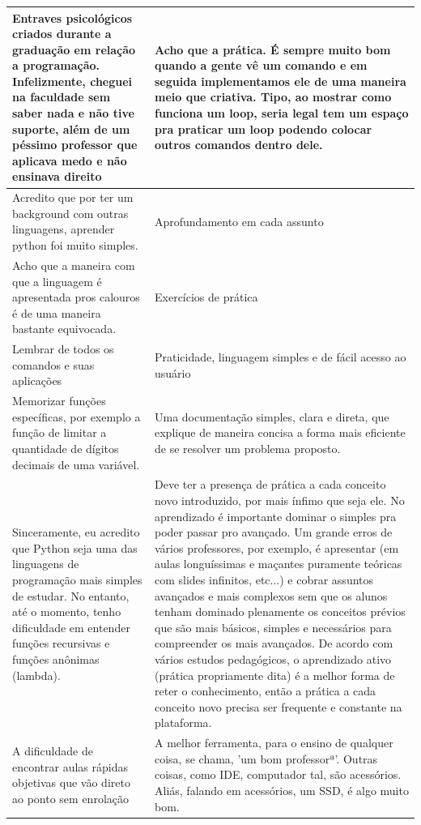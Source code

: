 \begin{longtable}{| p{} | p{} |}
    Entraves psicológicos criados durante a graduação em relação a programação. Infelizmente, cheguei na faculdade sem saber nada e não tive suporte, além de um péssimo professor que aplicava medo e não ensinava direito & Acho que a prática. É sempre muito bom quando a gente vê um comando e em seguida implementamos ele de uma maneira meio que criativa. Tipo, ao mostrar como funciona um loop, seria legal tem um espaço pra praticar um loop podendo colocar outros comandos dentro dele. \\ \hline
    Acredito que por ter um background com outras linguagens, aprender python foi muito simples. & Aprofundamento em cada assunto \\ \hline
    Acho que a maneira com que a linguagem é apresentada pros calouros é de uma maneira bastante equivocada. & Exercícios de prática \\ \hline
    Lembrar de todos os comandos e suas aplicações & Praticidade, linguagem simples e de fácil acesso ao usuário \\ \hline
    Memorizar funções específicas, por exemplo a função de limitar a quantidade de dígitos decimais de uma variável. & Uma documentação simples, clara e direta, que explique de maneira concisa a forma mais eficiente de se resolver um problema proposto. \\ \hline
    Sinceramente, eu acredito que Python seja uma das linguagens de programação mais simples de estudar. No entanto, até o momento, tenho dificuldade em entender funções recursivas e funções anônimas (lambda). & Deve ter a presença de prática a cada conceito novo introduzido, por mais ínfimo que seja ele. No aprendizado é importante dominar o simples pra poder passar pro avançado. Um grande erros de vários professores, por exemplo, é apresentar (em aulas longuíssimas e maçantes puramente teóricas com slides infinitos, etc...) e cobrar assuntos avançados e mais complexos sem que os alunos tenham dominado plenamente os conceitos prévios que são mais básicos, simples e necessários para compreender os mais avançados.  De acordo com vários estudos pedagógicos, o aprendizado ativo (prática propriamente dita) é a melhor forma de reter o conhecimento, então a prática a cada conceito novo precisa ser frequente e constante na plataforma. \\ \hline
    A dificuldade de encontrar aulas rápidas objetivas que vão direto ao ponto sem enrolação & A melhor ferramenta, para o ensino de qualquer coisa, se chama, 'um bom professorª'. Outras coisas, como IDE, computador tal, são acessórios. Aliás, falando em acessórios, um SSD, é algo muito bom. \\ \hline

\end{longtable}
